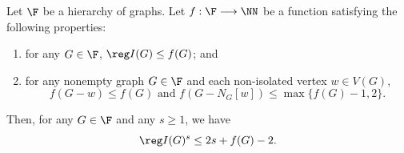 \begin{theo} \label{thm.hierarchy}
Let $\F$ be a hierarchy of graphs. Let $f : \F \longrightarrow \NN$ be a function satisfying the following properties:
\begin{enumerate}
\item\label{theo3.3_1} for any $G \in \F$, $\reg I(G) \le f(G)$; and
\item\label{theo3.3_2} for any nonempty graph $G \in \F$ and each non-isolated vertex $w \in V(G)$,
 \[
f(G-w) \le f(G) \text{ and } f(G - N_G[w]) \le \max\{f(G)-1, 2\}.
\]

\end{enumerate}
Then, for any $G \in \F$ and any $s \ge 1$, we have
\[
\reg I(G)^s \le 2s + f(G) - 2.
\]

\end{theo}
